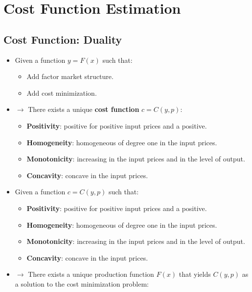 \documentclass[]{book}
\providecommand{\tightlist}{%
  \setlength{\itemsep}{0pt}\setlength{\parskip}{0pt}}
\begin{document}
\section{Cost Function Estimation}\label{cost-function-estimation}

\subsection{Cost Function: Duality}\label{cost-function-duality}

\begin{itemize}
\item
  Given a function \(y = F(x)\) such that:

  \begin{itemize}
  \tightlist
  \item
    Add factor market structure.
  \item
    Add cost minimization.
  \end{itemize}
\item
  \(\rightarrow\) There exists a unique \textbf{cost function}
  \(c = C(y, p)\):

  \begin{itemize}
  \tightlist
  \item
    \textbf{Positivity}: positive for positive input prices and a
    positive.
  \item
    \textbf{Homogeneity}: homogeneous of degree one in the input prices.
  \item
    \textbf{Monotonicity}: increasing in the input prices and in the
    level of output.
  \item
    \textbf{Concavity}: concave in the input prices.
  \end{itemize}
\item
  Given a function \(c = C(y, p)\) such that:

  \begin{itemize}
  \tightlist
  \item
    \textbf{Positivity}: positive for positive input prices and a
    positive.
  \item
    \textbf{Homogeneity}: homogeneous of degree one in the input prices.
  \item
    \textbf{Monotonicity}: increasing in the input prices and in the
    level of output.
  \item
    \textbf{Concavity}: concave in the input prices.
  \end{itemize}
\item
  \(\rightarrow\) There exists a unique production function \(F(x)\)
  that yields \(C(y, p)\) as a solution to the cost minimization
  problem:


\end{itemize}
\end{document}
